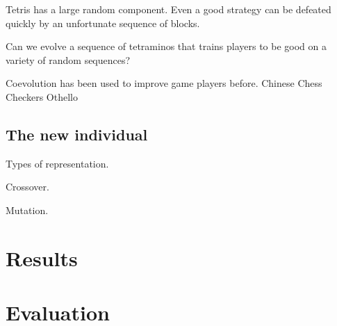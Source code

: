 \documentclass[a4paper,11pt]{article}
\begin{document}
Tetris has a large random component.
Even a good strategy can be defeated quickly by an unfortunate sequence of blocks.

Can we evolve a sequence of tetraminos that trains players to be good on a
variety of random sequences?

Coevolution has been used to improve game players before.
Chinese Chess \cite{ong2007discovering}
Checkers \cite{chellapilla1999evolving}
Othello \cite{moriarty1995discovering}

\subsection{The new individual}

Types of representation.

Crossover.

Mutation.

\section{Results}

\section{Evaluation}


\end{document}
